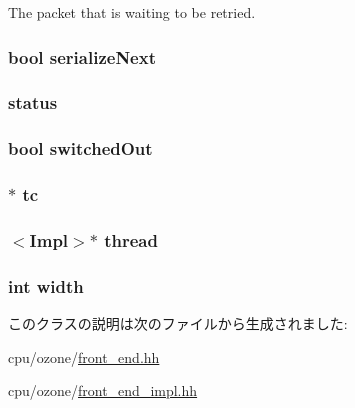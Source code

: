 \label{classFrontEnd_a314ae93c04b3ca96e79e1b1f39a8e478}
The packet that is waiting to be retried. \hypertarget{classFrontEnd_a7419c9cb2b5771ab5b23687a64c2af95}{
\subsubsection[{serializeNext}]{\setlength{\rightskip}{0pt plus 5cm}bool {\bf serializeNext}}}
\label{classFrontEnd_a7419c9cb2b5771ab5b23687a64c2af95}
\hypertarget{classFrontEnd_ae29aa2d4ae440022daaed1107eb306b3}{
\subsubsection[{status}]{ {\bf status}}}
\label{classFrontEnd_ae29aa2d4ae440022daaed1107eb306b3}
\hypertarget{classFrontEnd_a1aee6db9bfb75cf02e38a82e5d02847f}{
\subsubsection[{switchedOut}]{\setlength{\rightskip}{0pt plus 5cm}bool {\bf switchedOut}}}
\label{classFrontEnd_a1aee6db9bfb75cf02e38a82e5d02847f}
\hypertarget{classFrontEnd_a4455a4759e69e5ebe68ae7298cbcc37d}{
\subsubsection[{tc}]{$\ast$ {\bf tc}}}
\label{classFrontEnd_a4455a4759e69e5ebe68ae7298cbcc37d}
\hypertarget{classFrontEnd_ab6f834310107fd693035eba2eeca583f}{
\subsubsection[{thread}]{$<$Impl$>$$\ast$ {\bf thread}}}
\label{classFrontEnd_ab6f834310107fd693035eba2eeca583f}
\hypertarget{classFrontEnd_a2474a5474cbff19523a51eb1de01cda4}{
\subsubsection[{width}]{\setlength{\rightskip}{0pt plus 5cm}int {\bf width}}}
\label{classFrontEnd_a2474a5474cbff19523a51eb1de01cda4}


このクラスの説明は次のファイルから生成されました:\begin{DoxyCompactItemize}
\item 
cpu/ozone/\hyperlink{front__end_8hh}{front\_\-end.hh}\item 
cpu/ozone/\hyperlink{front__end__impl_8hh}{front\_\-end\_\-impl.hh}\end{DoxyCompactItemize}
